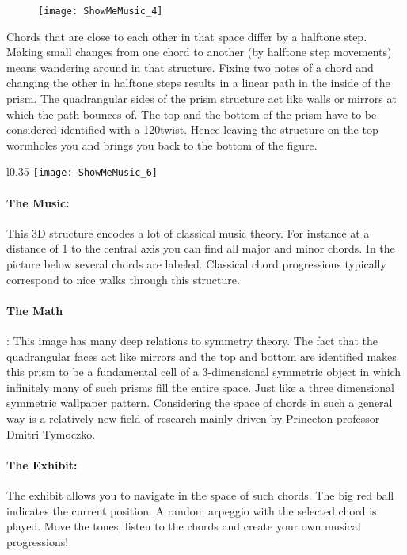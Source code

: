 \begin{figure}[h]
\centering
\texttt{[image: ShowMeMusic\_4]}
\end{figure}

Chords that are close to each other in that space differ by a halftone step. Making small changes from one chord to another (by halftone step movements) means wandering around in that structure. Fixing two notes of a chord and changing the other in halftone steps results in a linear path in the inside of the prism. The quadrangular sides of the prism structure act like walls or mirrors at which the path bounces of. The top and the bottom of the prism have to be considered identified with a 120\textdegree twist. Hence leaving the structure on the top wormholes you and brings you back to the bottom of the figure. 
 
\begin{wrapfigure}{l}{0.35\textwidth}
\centering
\texttt{[image: ShowMeMusic\_6]}
\end{wrapfigure}
\paragraph{The Music:} This 3D structure encodes a lot of classical music theory. For instance at a distance of 1 to the central axis you can find all major and minor chords. In the picture below several chords are labeled. Classical chord progressions typically correspond to nice walks through this structure.

\paragraph{The Math}: This image has many deep relations to symmetry theory. The fact that the quadrangular faces act like mirrors and the top and bottom are identified makes this prism to be a fundamental cell of a 3-dimensional symmetric object in which infinitely many of such prisms fill the entire space. Just like a three dimensional symmetric wallpaper pattern. Considering the space of chords in such a general way is a relatively new field of research mainly driven by Princeton professor Dmitri Tymoczko.\\

\paragraph{The Exhibit:} The exhibit allows you to navigate in the space of such chords. The big red ball indicates the current position. A random arpeggio with the selected chord is played. Move the tones, listen to the chords and create your own musical progressions! 

